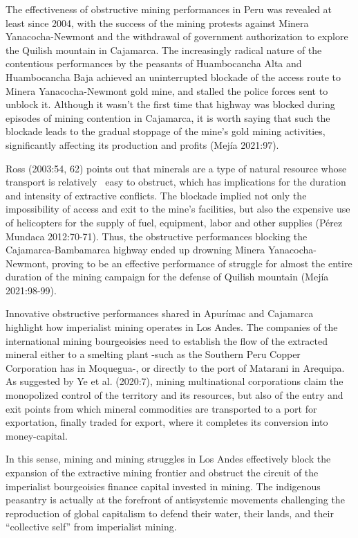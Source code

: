 \documentclass[
]{article}
\begin{document}
The effectiveness of obstructive mining performances in Peru was
revealed at least since 2004, with the success of the mining protests
against Minera Yanacocha-Newmont and the withdrawal of government
authorization to explore the Quilish mountain in Cajamarca. The
increasingly radical nature of the contentious performances by the
peasants of Huambocancha Alta and Huambocancha Baja achieved an
uninterrupted blockade of the access route to Minera Yanacocha-Newmont
gold mine, and stalled the police forces sent to unblock it. Although it
wasn't the first time that highway was blocked during episodes of mining
contention in Cajamarca, it is worth saying that such the blockade leads
to the gradual stoppage of the mine's gold mining activities,
significantly affecting its production and profits (Mejía 2021:97).

Ross (2003:54, 62) points out that minerals are a type of natural
resource whose transport is relatively ~easy to obstruct, which has
implications for the duration and intensity of extractive conflicts. The
blockade implied not only the impossibility of access and exit to the
mine's facilities, but also the expensive use of helicopters for the
supply of fuel, equipment, labor and other supplies (Pérez Mundaca
2012:70-71). Thus, the obstructive performances blocking the
Cajamarca-Bambamarca highway ended up drowning Minera Yanacocha-Newmont,
proving to be an effective performance of struggle for almost the entire
duration of the mining campaign for the defense of Quilish mountain
(Mejía 2021:98-99).

Innovative obstructive performances shared in Apurímac and Cajamarca
highlight how imperialist mining operates in Los Andes. The companies of
the international mining bourgeoisies need to establish the flow of the
extracted mineral either to a smelting plant -such as the Southern Peru
Copper Corporation has in Moquegua-, or directly to the port of Matarani
in Arequipa. As suggested by Ye et al. (2020:7), mining multinational
corporations claim the monopolized control of the territory and its
resources, but also of the entry and exit points from which mineral
commodities are transported to a port for exportation, finally traded
for export, where it completes its conversion into money-capital.

In this sense, mining and mining struggles in Los Andes effectively
block the expansion of the extractive mining frontier and obstruct the
circuit of the imperialist bourgeoisies finance capital invested in
mining. The indigenous peasantry is actually at the forefront of
antisystemic movements challenging the reproduction of global capitalism
to defend their water, their lands, and their ``collective self'' from
imperialist mining.
\end{document}
